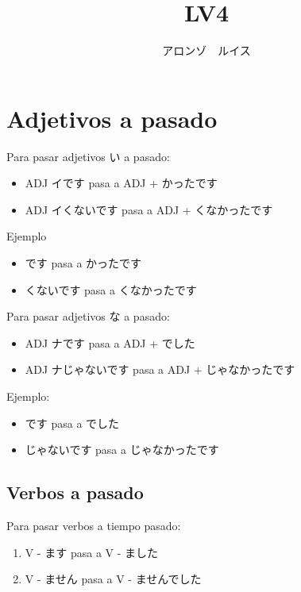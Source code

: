 \documentclass[a4paper,lualatex,ja=standard,base=10pt]{bxjsarticle}
\title{\ruby{第|０４|課}{だい||か} LV4}
\author{アロンゾ　ルイス}
\begin{document}
\setcounter{page}{1}

\maketitle{}
\thispagestyle{fancy}

\section{Adjetivos a pasado}


Para pasar adjetivos い a pasado:

\begin{itemize}
  \item ADJ イです pasa a ADJ + かったです
  \item ADJ イくないです pasa a ADJ + くなかったです
\end{itemize}

Ejemplo

\begin{itemize}
  \item {}です pasa a かったです
  \item {}くないです pasa a くなかったです
\end{itemize}

Para pasar adjetivos な a pasado:

\begin{itemize}
  \item ADJ ナです pasa a ADJ + でした
  \item ADJ ナじゃないです pasa a ADJ + じゃなかったです
\end{itemize}

Ejemplo:

\begin{itemize}
  \item {}です pasa a でした
  \item {}じゃないです pasa a じゃなかったです
\end{itemize}

\subsection{Verbos a pasado}

Para pasar verbos a tiempo pasado:

\begin{enumerate}
  \item V - ます pasa a V - ました
  \item V - ません pasa a V - ませんでした
\end{enumerate}
\end{document}
